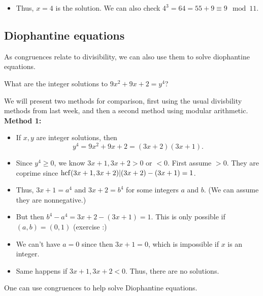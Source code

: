 \documentclass[11pt,dvipsnames]{book}
\def\hcf{{\rm hcf}}
\numberwithin{equation}{section} %
\numberwithin{figure}{section} %
\numberwithin{table}{section} %
\begin{document}
\begin{exercise}
\begin{itemize}
\item   Thus, $x=4$ is the solution.  We can also check $4^{3}=64=55+9\equiv 9\mod 11$. 
\end{itemize}






\subsection{Diophantine equations}

As congruences relate to divisibility, we can also use them to solve diophantine equations. 

\begin{example}
What are the integer solutions to $9x^{2}+9x+2=y^{4}$?
\end{example}

 
 We will present two methods for comparison, first using the usual divisbility methods from last week, and then a second method using modular arithmetic.\\

{\bf Method 1:} 
\begin{itemize}
\item  If $x,y$ are integer solutions, then
\[
y^{4}=9x^{2}+9x+2 =(3x+2)(3x+1).
\] 
\vspace{-10pt}
\item Since $y^{4}\geq 0$, we know $3x+1,3x+2> 0$ or $<0$.  First assume $>0$.   They are coprime since $\hcf(3x+1,3x+2)| (3x+2)-(3x+1)=1$.  
\item  Thus, $3x+1=a^{4}$ and $3x+2=b^{4}$ for some integers $a$ and $b$.   (We can assume they are nonnegative.) 
\item But then $b^{4}-a^{4} =3x+2-(3x+1) =1$.   This is only possible if $(a,b)=(0,1)$  (exercise :) 
\item We can't have $a=0$ since then $3x+1=0$,  which is impossible if $x$ is an integer.  
\item Same happens if $3x+1,3x+2<0$.  Thus, there are no solutions.
\end{itemize}





One can use congruences to help solve Diophantine equations.  
\vspace{10pt}


 


\end{exercise}
\end{document}
